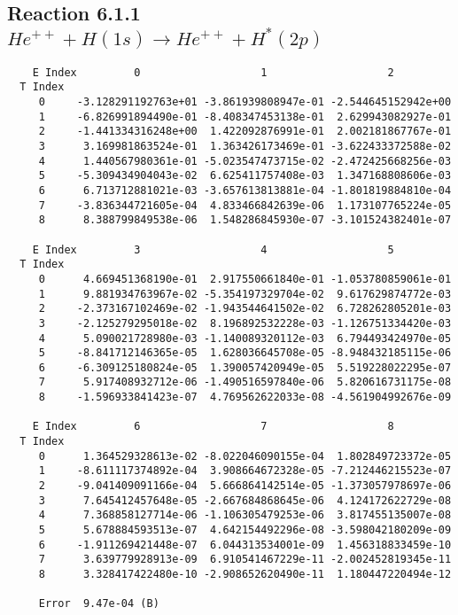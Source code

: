 \documentclass[12pt]{article}
\begin{document}
                              


\newpage
\subsection{
Reaction 6.1.1 $   He^{++} + H(1s) \rightarrow He^{++} + H^*(2p)$}


\begin{small}\begin{verbatim}
    E Index         0                   1                   2
  T Index
     0     -3.128291192763e+01 -3.861939808947e-01 -2.544645152942e+00
     1     -6.826991894490e-01 -8.408347453138e-01  2.629943082927e-01
     2     -1.441334316248e+00  1.422092876991e-01  2.002181867767e-01
     3      3.169981863524e-01  1.363426173469e-01 -3.622433372588e-02
     4      1.440567980361e-01 -5.023547473715e-02 -2.472425668256e-03
     5     -5.309434904043e-02  6.625411757408e-03  1.347168808606e-03
     6      6.713712881021e-03 -3.657613813881e-04 -1.801819884810e-04
     7     -3.836344721605e-04  4.833466842639e-06  1.173107765224e-05
     8      8.388799849538e-06  1.548286845930e-07 -3.101524382401e-07

    E Index         3                   4                   5
  T Index
     0      4.669451368190e-01  2.917550661840e-01 -1.053780859061e-01
     1      9.881934763967e-02 -5.354197329704e-02  9.617629874772e-03
     2     -2.373167102469e-02 -1.943544641502e-02  6.728262805201e-03
     3     -2.125279295018e-02  8.196892532228e-03 -1.126751334420e-03
     4      5.090021728980e-03 -1.140089320112e-03  6.794493424970e-05
     5     -8.841712146365e-05  1.628036645708e-05 -8.948432185115e-06
     6     -6.309125180824e-05  1.390057420949e-05  5.519228022295e-07
     7      5.917408932712e-06 -1.490516597840e-06  5.820616731175e-08
     8     -1.596933841423e-07  4.769562622033e-08 -4.561904992676e-09

    E Index         6                   7                   8
  T Index
     0      1.364529328613e-02 -8.022046090155e-04  1.802849723372e-05
     1     -8.611117374892e-04  3.908664672328e-05 -7.212446215523e-07
     2     -9.041409091166e-04  5.666864142514e-05 -1.373057978697e-06
     3      7.645412457648e-05 -2.667684868645e-06  4.124172622729e-08
     4      7.368858127714e-06 -1.106305479253e-06  3.817455135007e-08
     5      5.678884593513e-07  4.642154492296e-08 -3.598042180209e-09
     6     -1.911269421448e-07  6.044313534001e-09  1.456318833459e-10
     7      3.639779928913e-09  6.910541467229e-11 -2.002452819345e-11
     8      3.328417422480e-10 -2.908652620490e-11  1.180447220494e-12

     Error  9.47e-04 (B)
\end{verbatim}\end{small}
\end{document}
